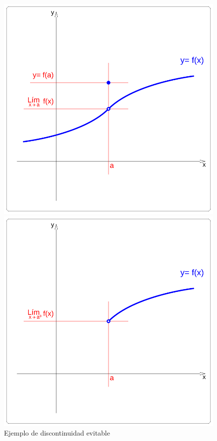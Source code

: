 \begin{figure}
\centering
\includegraphics[scale=0.25]{img/Funs/funcion_xy_discontin_4hStg}
\caption{Ejemplo de discontinuidad evitable}
\label{fig::fun-tipos-discontinuidad}
\includegraphics[scale=0.25]{img/Funs/funcion_xy_discontin_4jSGg}

\end{figure}
